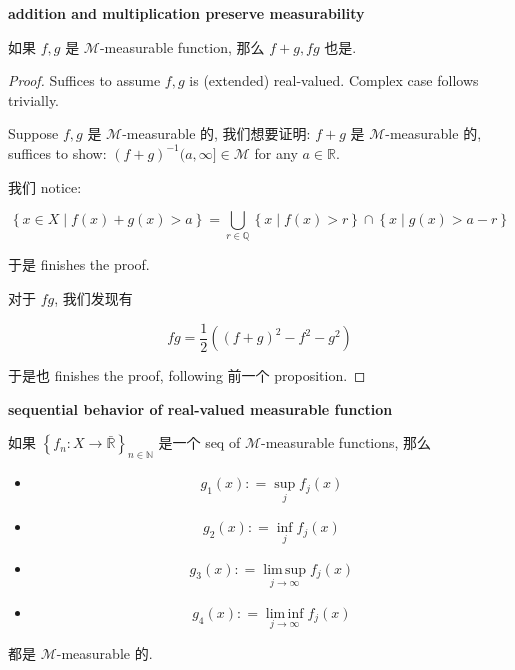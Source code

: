 \documentclass{qlnotes-export}
\begin{document}
\begin{proposition}{\protect{}\label{kn-arithmetic-preserves-measurability}{\textbf{addition
and multiplication preserve measurability}}}

如果 \(f,g\) 是 \(\mathcal{M}\)-measurable function, 那么 \(f + g,fg\) 也是.

\end{proposition}

\begin{proof}

Suffices to assume \(f,g\) is (extended) real-valued. Complex case follows trivially.

Suppose \(f,g\) 是 \(\mathcal{M}\)-measurable 的, 我们想要证明: \(f + g\) 是 \(\mathcal{M}\)-measurable 的, suffices to show: \((f + g)^{- 1}(a,\infty\rbrack \in \mathcal{M}\) for any \(a \in {\mathbb{R}}\).

我们 notice:

\[\left\{ {x \in X \mid f(x) + g(x) > a} \right\} = \bigcup\limits_{r \in {\mathbb{Q}}}\left\{ {x \mid f(x) > r} \right\} \cap \left\{ {x \mid g(x) > a - r} \right\}\]

于是 finishes the proof.

对于 \(fg\), 我们发现有

\[fg = \frac{1}{2}((f + g)^{2} - f^{2} - g^{2})\]

于是也 finishes the proof, following 前一个 proposition.

\end{proof}

\begin{lemma}{\protect{}\label{kn-sequential-behavior-of-real-valued-measurable-function}{\textbf{sequential
behavior of real-valued measurable function}}}

如果 \(\left\{ {f_{n}:X\rightarrow\bar{\mathbb{R}}} \right\}_{n \in {\mathbb{N}}}\) 是一个 seq of \(\mathcal{M}\)-measurable functions, 那么

\begin{itemize}
\tightlist
\item
  \[g_{1}(x): = \sup\limits_{j}f_{j}(x)\]
\item
  \[g_{2}(x): = \inf\limits_{j}f_{j}(x)\]
\item
  \[g_{3}(x): = \operatorname{lim\, sup}\limits_{j\rightarrow\infty}f_{j}(x)\]
\item
  \[g_{4}(x): = \operatorname{lim\, inf}\limits_{j\rightarrow\infty}f_{j}(x)\]
\end{itemize}

都是 \(\mathcal{M}\)-measurable 的.

\end{lemma}
\end{document}
